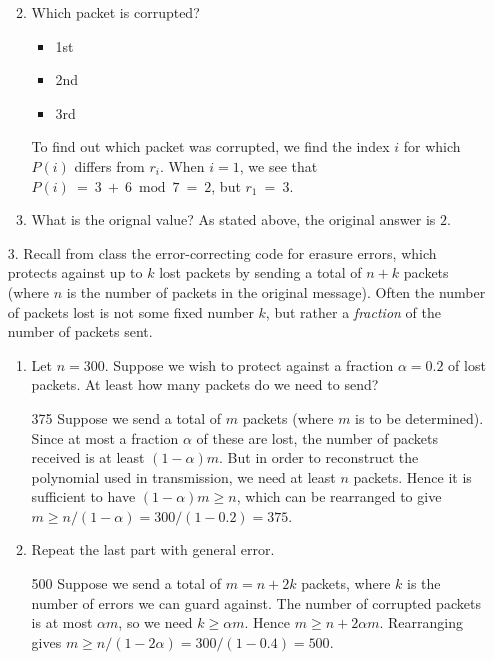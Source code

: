 \documentclass[11pt,preview]{standalone} %
\begin{document}
\begin{enumerate}
\begin{enumerate}
\begin{Freeform}{0}
    \end{Freeform}
    \item Which packet is corrupted?
      \begin{Choices}
        \begin{itemize}
        \TrueChoice \item 1st
        \FalseChoice \item 2nd
        \FalseChoice \item 3rd
        \end{itemize}
        \Solution To find out which packet was corrupted, we find the index $i$ for which $P(i)$ differs from $r_i$. When $i = 1$, we see that $P(i)\ =\ 3\ +\ 6 \bmod 7\ =\ 2$, but $r_1\ =\ 3$.
      \end{Choices}
    \item 
    \begin{Freeform}{2}
      What is the orignal value?
      \Solution As stated above, the original answer is $2$.
    \end{Freeform}
  \end{enumerate}

\item[3.] Recall from class the error-correcting code for erasure errors, which
protects against up to $k$ lost packets by sending a total of $n+k$ packets
(where $n$ is the number of packets in the original message).  Often the number
of packets lost is not some fixed number $k$, but rather a \emph{fraction} of
the number of packets sent.  

\begin{enumerate}
\item Let $n = 300$. Suppose we wish to protect against a fraction $\alpha = 0.2$ of lost packets.  At least how many packets do 
we need to send?
\begin{Freeform}{375}
\Solution Suppose we send a total of $m$ packets (where $m$ is to be determined).
  Since at most a fraction $\alpha$ of these are lost, the number of packets
  received is at least $(1-\alpha)m$. But in order to reconstruct the
  polynomial used in transmission, we need at least $n$ packets. Hence it is
  sufficient to have $(1-\alpha)m \geq n$, which can be rearranged to give $m\geq
    n/(1-\alpha) = 300 / (1 - 0.2) = 375$.
\end{Freeform}

\item Repeat the last part with general error. 
\begin{Freeform}{500}
\Solution Suppose we send a total of $m = n + 2k$ packets, where $k$ is the number
  of errors we can guard against. The number of corrupted packets is at most
  $\alpha m$, so we need $k \geq \alpha m$. Hence $m \geq n + 2\alpha m$.
    Rearranging gives $m\geq n/(1-2\alpha) = 300 / (1 - 0.4) = 500$.
\end{Freeform}
\end{enumerate}
\end{enumerate}
\end{document}
